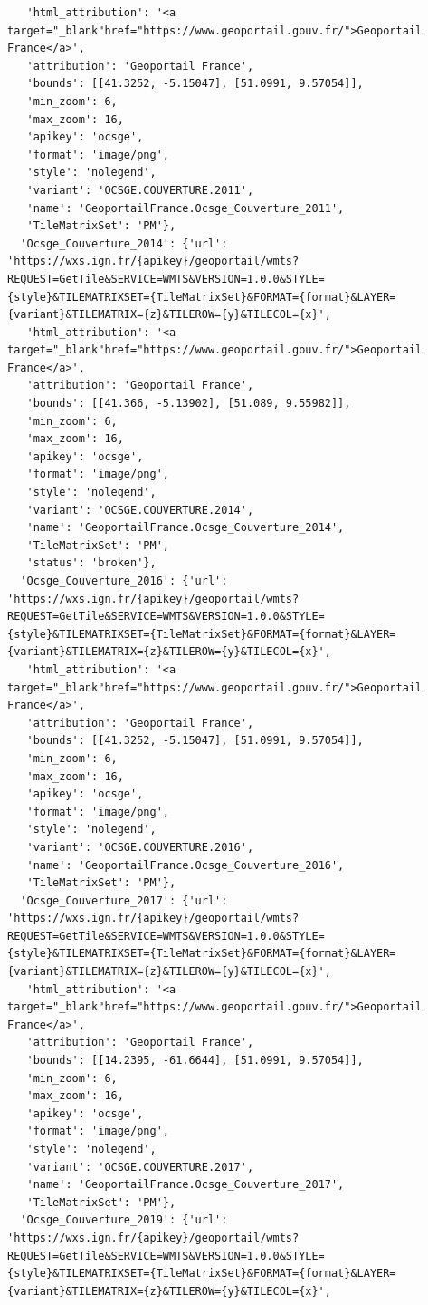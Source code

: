 \documentclass[
  letterpaper,
  DIV=11,
  numbers=noendperiod]{scrreprt}
\begin{document}
\begin{verbatim}
   'html_attribution': '<a target="_blank"href="https://www.geoportail.gouv.fr/">Geoportail France</a>',
   'attribution': 'Geoportail France',
   'bounds': [[41.3252, -5.15047], [51.0991, 9.57054]],
   'min_zoom': 6,
   'max_zoom': 16,
   'apikey': 'ocsge',
   'format': 'image/png',
   'style': 'nolegend',
   'variant': 'OCSGE.COUVERTURE.2011',
   'name': 'GeoportailFrance.Ocsge_Couverture_2011',
   'TileMatrixSet': 'PM'},
  'Ocsge_Couverture_2014': {'url': 'https://wxs.ign.fr/{apikey}/geoportail/wmts?REQUEST=GetTile&SERVICE=WMTS&VERSION=1.0.0&STYLE={style}&TILEMATRIXSET={TileMatrixSet}&FORMAT={format}&LAYER={variant}&TILEMATRIX={z}&TILEROW={y}&TILECOL={x}',
   'html_attribution': '<a target="_blank"href="https://www.geoportail.gouv.fr/">Geoportail France</a>',
   'attribution': 'Geoportail France',
   'bounds': [[41.366, -5.13902], [51.089, 9.55982]],
   'min_zoom': 6,
   'max_zoom': 16,
   'apikey': 'ocsge',
   'format': 'image/png',
   'style': 'nolegend',
   'variant': 'OCSGE.COUVERTURE.2014',
   'name': 'GeoportailFrance.Ocsge_Couverture_2014',
   'TileMatrixSet': 'PM',
   'status': 'broken'},
  'Ocsge_Couverture_2016': {'url': 'https://wxs.ign.fr/{apikey}/geoportail/wmts?REQUEST=GetTile&SERVICE=WMTS&VERSION=1.0.0&STYLE={style}&TILEMATRIXSET={TileMatrixSet}&FORMAT={format}&LAYER={variant}&TILEMATRIX={z}&TILEROW={y}&TILECOL={x}',
   'html_attribution': '<a target="_blank"href="https://www.geoportail.gouv.fr/">Geoportail France</a>',
   'attribution': 'Geoportail France',
   'bounds': [[41.3252, -5.15047], [51.0991, 9.57054]],
   'min_zoom': 6,
   'max_zoom': 16,
   'apikey': 'ocsge',
   'format': 'image/png',
   'style': 'nolegend',
   'variant': 'OCSGE.COUVERTURE.2016',
   'name': 'GeoportailFrance.Ocsge_Couverture_2016',
   'TileMatrixSet': 'PM'},
  'Ocsge_Couverture_2017': {'url': 'https://wxs.ign.fr/{apikey}/geoportail/wmts?REQUEST=GetTile&SERVICE=WMTS&VERSION=1.0.0&STYLE={style}&TILEMATRIXSET={TileMatrixSet}&FORMAT={format}&LAYER={variant}&TILEMATRIX={z}&TILEROW={y}&TILECOL={x}',
   'html_attribution': '<a target="_blank"href="https://www.geoportail.gouv.fr/">Geoportail France</a>',
   'attribution': 'Geoportail France',
   'bounds': [[14.2395, -61.6644], [51.0991, 9.57054]],
   'min_zoom': 6,
   'max_zoom': 16,
   'apikey': 'ocsge',
   'format': 'image/png',
   'style': 'nolegend',
   'variant': 'OCSGE.COUVERTURE.2017',
   'name': 'GeoportailFrance.Ocsge_Couverture_2017',
   'TileMatrixSet': 'PM'},
  'Ocsge_Couverture_2019': {'url': 'https://wxs.ign.fr/{apikey}/geoportail/wmts?REQUEST=GetTile&SERVICE=WMTS&VERSION=1.0.0&STYLE={style}&TILEMATRIXSET={TileMatrixSet}&FORMAT={format}&LAYER={variant}&TILEMATRIX={z}&TILEROW={y}&TILECOL={x}',

\end{verbatim}
\end{document}
